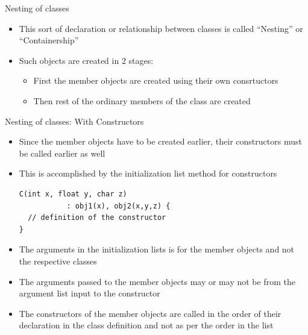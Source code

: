 \documentclass{beamer}
\begin{document}
\begin{frame}[fragile]{Nesting of classes}
  \begin{itemize}
  \item This sort of declaration or relationship between classes is called ``Nesting'' or ``Containership''\pause
  \item Such objects are created in 2 stages:\pause
    \begin{itemize}
    \item First the member objects are created using their own consrtuctors\pause
    \item Then rest of the ordinary members of the class are created
    \end{itemize}
  \end{itemize}
\end{frame}

\begin{frame}[fragile]{Nesting of classes: With Constructors}
  \begin{itemize}
  \item Since the member objects have to be created earlier, their constructors must be called earlier as well\pause
  \item This is accomplished by the initialization list method for constructors\pause
    \begin{lstlisting}
C(int x, float y, char z)
           : obj1(x), obj2(x,y,z) {
  // definition of the constructor
}
    \end{lstlisting}\pause
  \item The arguments in the initialization lists is for the member objects and not the respective classes\pause
  \item The arguments passed to the member objects may or may not be from the argument list input to the constructor\pause
\item The constructors of the member objects are called in the order of their declaration in the class definition and not as per the order in the list
  \end{itemize}
\end{frame}

\end{document}
